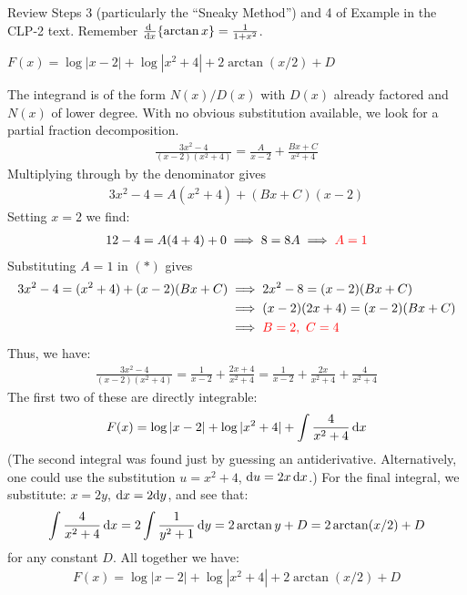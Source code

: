 \begin{hint}
Review Steps 3 (particularly the ``Sneaky Method'') and 4 of
Example 
in the %
CLP-2 text. Remember $\diff{}{x}\{\arctan x\} = \frac{1}{1+x^2}$.
\end{hint}

\begin{answer}
$ F(x) = \log |x-2| + \log |x^2+4| + 2\arctan (x/2) + D$
\end{answer}

\begin{solution}
The integrand is of the form $N(x)/D(x)$ with $D(x)$ already factored
and $N(x)$ of lower degree. With no obvious substitution available, we look for a partial fraction decomposition.
\begin{align*}
\frac{3x^2 -4}{(x-2)(x^2+4)} = \frac{A}{x-2} + \frac{Bx + C}{x^2+4}
\end{align*}
Multiplying through by the denominator gives
\begin{align}
3x^2 -4 = A(x^2+4) + (Bx + C)(x-2)
\tag{$*$}
\end{align}
Setting $x=2$ we find:
\begin{align*}
   12 -4 = A(4 + 4) + 0 \implies 8 =8A  \implies \color{red}A = 1
\end{align*}
Substituting $A=1$ in $(*)$ gives
\begin{align*}
 3x^2 -4  = (x^2+4) + (x-2)(Bx + C)
  &\implies   2x^2-8 =(x-2)(Bx + C) \\
  &\implies   (x-2)(2x+4)=(x-2)(Bx + C) \\
  & \implies \color{red} B=2,~C=4
\end{align*}
Thus, we have:
\begin{align*}
 \frac{3x^2 -4}{(x-2)(x^2+4)} = \frac{1}{x-2} + \frac{2x + 4}{x^2+4} = \frac{1}{x-2} + \frac{2x }{x^2+4} + \frac{4}{x^2+4 }
\end{align*}
The first two of these are directly integrable:
\begin{align*}
  F(x) = \log |x-2| + \log |x^2+4| + \int \frac{4}{x^2+4}\,\mathrm{d}x
\end{align*}
(The second integral was found just by guessing an antiderivative.
Alternatively, one could use the substitution $u=x^2+4$, $\mathrm{d}u=2x\,\mathrm{d}x$.)
For the final integral, we substitute: $x = 2y$,
$\mathrm{d}x = 2\mathrm{d}y$, and see that:
\begin{align*}
  \int \frac{4}{x^2+4}\,\mathrm{d}x  = 2 \int \frac{1}{y^2 + 1}\,\mathrm{d}y = 2 \arctan y + D = 2\arctan (x/2) + D
\end{align*}
for any constant $D$. All together we have:
\begin{align*}
   F(x) = \log |x-2| + \log |x^2+4| + 2\arctan (x/2) + D
\end{align*}
\end{solution}


